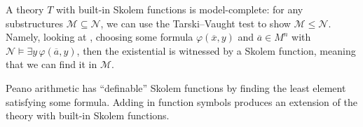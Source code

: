 \documentclass[../notes.tex]{subfiles}
\begin{document}
\begin{remark} \label{rem:skolem-implies-model-complete}
	A theory $T$ with built-in Skolem functions is model-complete: for any substructures $\mathcal M\subseteq\mathcal N$, we can use the Tarski--Vaught test to show $\mathcal M\le\mathcal N$. Namely, looking at , choosing some formula $\varphi(\overline x,y)$ and $\overline a\in M^n$ with $\mathcal N\models\exists y\,\varphi(\overline a,y)$, then the existential is witnessed by a Skolem function, meaning that we can find it in $\mathcal M$.
\end{remark}
\begin{example}
	Peano arithmetic has ``definable'' Skolem functions by finding the least element satisfying some formula. Adding in function symbols produces an extension of the theory with built-in Skolem functions.
\end{example}
\end{document}
